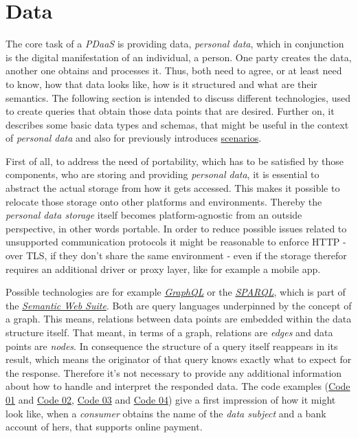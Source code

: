 \documentclass[12pt,english,a4paper,titlepage,cleardoublepage=empty,dottedtoc]{report}
\begin{document}
\hypertarget{data}{\section{Data}\label{data}}

The core task of a \emph{PDaaS} is providing data, \emph{personal data},
which in conjunction is the digital manifestation of an individual, a
person. One party creates the data, another one obtains and processes
it. Thus, both need to agree, or at least need to know, how that data
looks like, how is it structured and what are their semantics. The
following section is intended to discuss different technologies, used to
create queries that obtain those data points that are desired. Further
on, it describes some basic data types and schemas, that might be useful
in the context of \emph{personal data} and also for previously
introduces \protect\hyperlink{scenarios}{scenarios}.

First of all, to address the need of portability, which has to be
satisfied by those components, who are storing and providing
\emph{personal data}, it is essential to abstract the actual storage
from how it gets accessed. This makes it possible to relocate those
storage onto other platforms and environments. Thereby the
\emph{personal data storage} itself becomes platform-agnostic from an
outside perspective, in other words portable. In order to reduce
possible issues related to unsupported communication protocols it might
be reasonable to enforce HTTP - over TLS, if they don't share the same
environment - even if the storage therefor requires an additional driver
or proxy layer, like for example a mobile app.

Possible technologies are for example
\emph{\protect\hyperlink{def--graphql}{GraphQL}} or the
\emph{\protect\hyperlink{def--sparql}{SPARQL}}, which is part of the
\emph{\protect\hyperlink{def--semantic-web}{Semantic Web Suite}}. Both
are query languages underpinned by the concept of a graph. This means,
relations between data points are embedded within the data structure
itself. That meant, in terms of a graph, relations are \emph{edges} and
data points are \emph{nodes}. In consequence the structure of a query
itself reappears in its result, which means the originator of that query
knows exactly what to expect for the response. Therefore it's not
necessary to provide any additional information about how to handle and
interpret the responded data. The code examples
(\protect\hyperlink{code-01_sparql-query}{Code 01} and
\protect\hyperlink{code-02_sparql-query-results}{Code 02},
\protect\hyperlink{code-03_graphql-query}{Code 03} and
\protect\hyperlink{code-04_graphql-query-result}{Code 04}) give a first
impression of how it might look like, when a \emph{consumer} obtains the
name of the \emph{data subject} and a bank account of hers, that
supports online payment.
\end{document}
